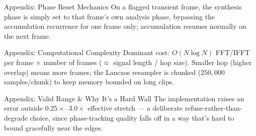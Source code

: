 \documentclass[aspectratio=169]{beamer}
\begin{document}
\begin{frame}{Appendix: Phase Reset Mechanics}
  On a flagged transient frame, the synthesis phase is simply set to that
  frame's own analysis phase, bypassing the accumulation recurrence for
  one frame only; accumulation resumes normally on the next frame.
\end{frame}

\begin{frame}{Appendix: Computational Complexity}
  Dominant cost: $O(N\log N)$ FFT/IFFT per frame $\times$ number of frames
  ($\approx$ signal length / hop size). Smaller hop (higher overlap) means
  more frames; the Lanczos resampler is chunked ($250{,}000$ samples/chunk)
  to keep memory bounded on long clips.
\end{frame}

\begin{frame}{Appendix: Valid Range \& Why It's a Hard Wall}
  The implementation raises an error outside $0.25\times$--$3.0\times$
  effective stretch --- a deliberate refuse-rather-than-degrade choice,
  since phase-tracking quality falls off in a way that's hard to bound
  gracefully near the edges.
\end{frame}
\end{document}
